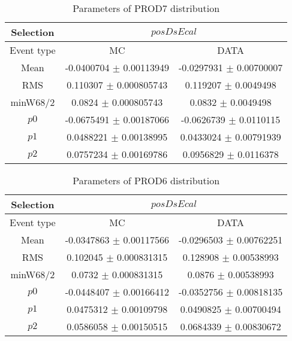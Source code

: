 \documentclass[a4paper,12pt]{article}
\begin{document}
\begin{table}[htbp]
\begin{center}
\begin{tabular}{|c|c|c|}
        \hline
        Selection & \multicolumn{2}{|c|}{$posDsEcal$}  \\ \hline
        Event type & MC & DATA \\ 
        \hline
        Mean & -0.0400704 $\pm$ 0.00113949 & -0.0297931 $\pm$ 0.00700007 \\ 
        \hline 
        RMS & 0.110307 $\pm$ 0.000805743 & 0.119207 $\pm$ 0.0049498 \\ 
        \hline 
        minW68/2 & 0.0824 $\pm$ 0.000805743 & 0.0832 $\pm$ 0.0049498 \\ 
        \hline 
        $p0$ & -0.0675491 $\pm$ 0.00187066 & -0.0626739 $\pm$ 0.0110115 \\ 
        \hline 
        $p1$ & 0.0488221 $\pm$ 0.00138995 & 0.0433024 $\pm$ 0.00791939 \\ 
        \hline 
        $p2$ & 0.0757234 $\pm$ 0.00169786 & 0.0956829 $\pm$ 0.0116378 \\ 
        \hline 
\end{tabular}
\caption{Parameters of PROD7 distribution } \vspace{0.2in}
\label{xxx}
\end{center}
\end{table}
\begin{table}[htbp]
\begin{center}
\begin{tabular}{|c|c|c|}
        \hline
        Selection & \multicolumn{2}{|c|}{$posDsEcal$}  \\ \hline
        Event type & MC & DATA \\ 
        \hline
        Mean & -0.0347863 $\pm$ 0.00117566 & -0.0296503 $\pm$ 0.00762251 \\ 
        \hline 
        RMS & 0.102045 $\pm$ 0.000831315 & 0.128908 $\pm$ 0.00538993 \\ 
        \hline 
        minW68/2 & 0.0732 $\pm$ 0.000831315 & 0.0876 $\pm$ 0.00538993 \\ 
        \hline 
        $p0$ & -0.0448407 $\pm$ 0.00166412 & -0.0352756 $\pm$ 0.00818135 \\ 
        \hline 
        $p1$ & 0.0475312 $\pm$ 0.00109798 & 0.0490825 $\pm$ 0.00700494 \\ 
        \hline 
        $p2$ & 0.0586058 $\pm$ 0.00150515 & 0.0684339 $\pm$ 0.00830672 \\ 
        \hline 
\end{tabular}
\caption{Parameters of PROD6 distribution } \vspace{0.2in}
\label{xxx}
\end{center}
\end{table}
\end{document}
